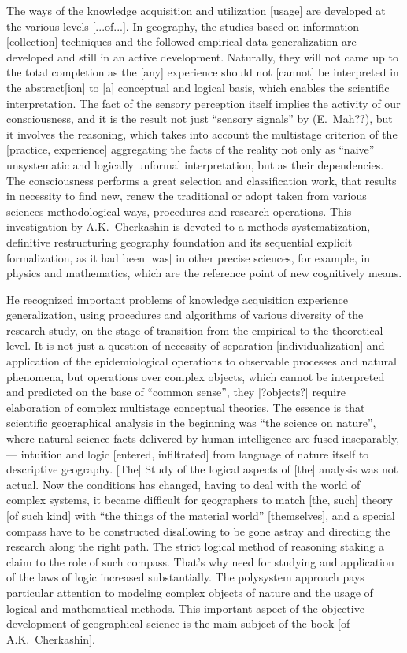 \documentclass[12pt,leqno]{book}
\begin{document}
The ways of the knowledge acquisition and utilization [usage] are developed at the various levels [...of...]. In geography, the studies based on information [collection] techniques and the followed empirical data generalization are developed and still in an active development. Naturally, they will not came up to the total completion as the [any] experience should not [cannot] be interpreted in the abstract[ion] to [a] conceptual and logical basis, which enables the scientific interpretation. The fact of the sensory perception itself implies the activity of our consciousness, and it is the result not just ``sensory signals'' by (E.~Mah??), but it involves the reasoning, which takes into account the multistage criterion of the [practice, experience] aggregating the facts of the reality not only as ``naive'' unsystematic and logically unformal interpretation, but as their dependencies. The consciousness performs a great selection and classification work, that results in necessity to find new, renew the traditional or adopt taken from various sciences methodological ways, procedures and research operations. This investigation by A.K.~Cherkashin is devoted to a methods systematization, definitive restructuring geography foundation and its sequential explicit formalization, as it had been [was] in other precise sciences, for example, in physics and mathematics, which are the reference point of new cognitively means.

He recognized important problems of knowledge acquisition experience generalization, using procedures and algorithms of various diversity of the research study, on the stage of transition from the empirical to the theoretical level. It is not just a question of necessity of separation [individualization] and application of the epidemiological operations to observable processes and natural phenomena, but operations over complex objects, which cannot be interpreted and predicted on the base of ``common sense'', they [?objects?] require elaboration of complex multistage conceptual theories. The essence is that scientific geographical analysis in the beginning was ``the science on nature'', where natural science facts delivered by human intelligence are fused inseparably, --- intuition and logic [entered, infiltrated] from language of nature itself to descriptive geography. [The] Study of the logical aspects of [the] analysis was not actual. Now the conditions has changed, having to deal with the world of complex systems, it became difficult for geographers to match [the, such] theory [of such kind] with ``the things of the material world'' [themselves], and a special compass have to be constructed disallowing to be gone astray and directing the research along the right path. The strict logical method of reasoning staking a claim to the role of such compass. That's why need for studying and application of the laws of logic increased substantially. The polysystem approach pays particular attention to modeling complex objects of nature and the usage of logical and mathematical methods. This important aspect of the objective development of geographical science is the main subject of the book [of A.K.~Cherkashin].
\end{document}

